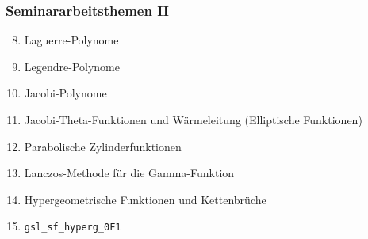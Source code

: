 %
%
%
\begin{frame}
\frametitle{Seminararbeitsthemen II\phantom{I}}
\begin{enumerate}[<+->]
\setcounter{enumi}{7}
\item Laguerre-Polynome
\item Legendre-Polynome
\item Jacobi-Polynome
\item Jacobi-Theta-Funktionen und Wärmeleitung (Elliptische Funktionen)
\item Parabolische Zylinderfunktionen
\item Lanczos-Methode für die Gamma-Funktion
\item Hypergeometrische Funktionen und Kettenbrüche
\item \texttt{gsl\_sf\_hyperg\_0F1}
\end{enumerate}
\end{frame}

